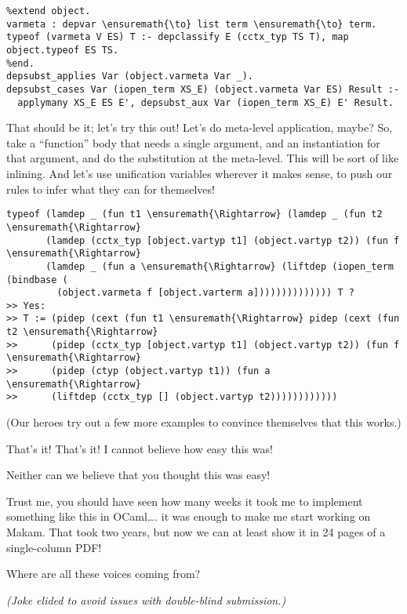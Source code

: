 \begin{verbatim}
%extend object.
varmeta : depvar \ensuremath{\to} list term \ensuremath{\to} term.
typeof (varmeta V ES) T :- depclassify E (cctx_typ TS T), map object.typeof ES TS.
%end.
depsubst_applies Var (object.varmeta Var _).
depsubst_cases Var (iopen_term XS_E) (object.varmeta Var ES) Result :-
  applymany XS_E ES E', depsubst_aux Var (iopen_term XS_E) E' Result.
\end{verbatim}

\heroADVISOR{} That should be it; let's try this out! Let's do meta-level
application, maybe? So, take a ``function'' body that needs a single
argument, and an instantiation for that argument, and do the
substitution at the meta-level. This will be sort of like inlining. And
let's use unification variables wherever it makes sense, to push our
rules to infer what they can for themselves!

\begin{verbatim}
typeof (lamdep _ (fun t1 \ensuremath{\Rightarrow} (lamdep _ (fun t2 \ensuremath{\Rightarrow}
       (lamdep (cctx_typ [object.vartyp t1] (object.vartyp t2)) (fun f \ensuremath{\Rightarrow}
       (lamdep _ (fun a \ensuremath{\Rightarrow} (liftdep (iopen_term (bindbase (
         (object.varmeta f [object.varterm a]))))))))))))) T ?
>> Yes:
>> T := (pidep (cext (fun t1 \ensuremath{\Rightarrow} pidep (cext (fun t2 \ensuremath{\Rightarrow}
>>      (pidep (cctx_typ [object.vartyp t1] (object.vartyp t2)) (fun f \ensuremath{\Rightarrow}
>>      (pidep (ctyp (object.vartyp t1)) (fun a \ensuremath{\Rightarrow}
>>      (liftdep (cctx_typ [] (object.vartyp t2))))))))))))
\end{verbatim}

\begin{scenecomment}
(Our heroes try out a few more examples to convince themselves that this works.)
\end{scenecomment}

\heroSTUDENT{} That's it! That's it! I cannot believe how easy this was!

\heroAUDIENCE{} Neither can we believe that you thought this was easy!

\heroAUTHOR{} Trust me, you should have seen how many weeks it took me to
implement something like this in OCaml\ldots{}. it was enough to make me
start working on Makam. That took two years, but now we can at least
show it in 24 pages of a single-column PDF!

\heroADVISOR{} Where are all these voices coming from?

\heroSTUDENT{}
\textit{(Joke elided to avoid issues with double-blind submission.)}

